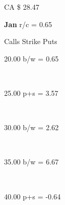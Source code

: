 \documentclass[]{article}
\begin{document}
\Large

		\begin{center}{\parbox[][4.5 mm][t]{40mm}{CA \$ 28.47} \hspace{5mm} \textbf{Jan} \hspace{20mm} r/c = 0.65}\end{center}

		\vspace{5mm}

		\begin{center} {Calls \hspace{28mm} Strike \hspace{26mm} Puts}\end{center}
		\vspace{5mm}
		\large \parbox[][][t]{40mm}{\hspace{40mm}} \hspace{36.5mm} \LARGE \parbox[][][t]{10mm}{} \hspace{55mm} \large \parbox[][][t]{40mm}{20.00 b/w = 0.65} \vspace{6.5mm} \\
		\large \parbox[][][t]{40mm}{25.00 p+s = 3.57} \hspace{36.5mm} \LARGE \parbox[][][t]{10mm}{} \hspace{55mm} \large \parbox[][][t]{40mm}{\hspace{40mm}} \vspace{6.5mm} \\
		\large \parbox[][][t]{40mm}{\hspace{40mm}} \hspace{36.5mm} \LARGE \parbox[][][t]{10mm}{} \hspace{55mm} \large \parbox[][][t]{40mm}{30.00 b/w = 2.62} \vspace{6.5mm} \\
		\large \parbox[][][t]{40mm}{\hspace{40mm}} \hspace{36.5mm} \LARGE \parbox[][][t]{10mm}{} \hspace{55mm} \large \parbox[][][t]{40mm}{35.00 b/w = 6.67} \vspace{6.5mm} \\
		\large \parbox[][][t]{40mm}{40.00 p+s = -0.64} \hspace{36.5mm} \LARGE \parbox[][][t]{10mm}{} \hspace{55mm} \large \parbox[][][t]{40mm}{\hspace{40mm}}
\end{document}

